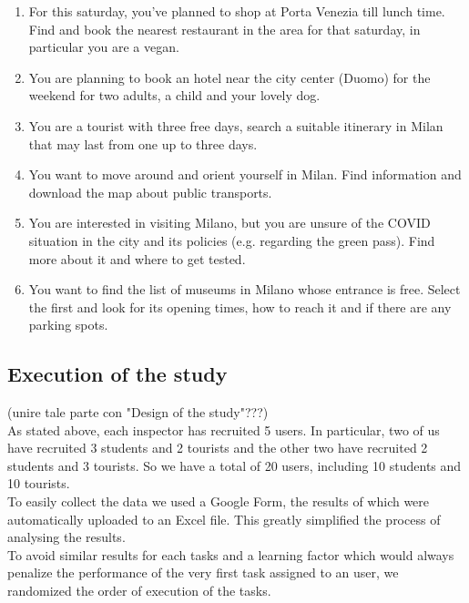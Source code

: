     \begin{enumerate}
        \item For this saturday, you've planned to shop at Porta Venezia till lunch time. Find and book the nearest restaurant in the area for that saturday, in particular you are a vegan.
        \item You are planning to book an hotel near the city center (Duomo) for the weekend for two adults, a child and your lovely dog.
        \item You are a tourist with three free days, search a suitable itinerary in Milan that may last from one up to three days.
        \item You want to move around and orient yourself in Milan. Find information and download the map about public transports.
        \item You are interested in visiting Milano, but you are unsure of the COVID situation in the city and its policies (e.g. regarding the green pass). Find more about it and where to get tested.
        \item You want to find the list of museums in Milano whose entrance is free. Select the first and look for its opening times, how to reach it and if there are any parking spots.
    \end{enumerate}
    
\subsection{Execution of the study}
    (unire tale parte con "Design of the study"???)\\
    As stated above, each inspector has recruited 5 users. In particular, two of us have recruited 3 students and 2 tourists and the other two have recruited 2 students and 3 tourists. So we have a total of 20 users, including 10 students and 10 tourists.\\
    To easily collect the data we used a Google Form, the results of which were automatically uploaded to an Excel file. This greatly simplified the process of analysing the results.\\
    To avoid similar results for each tasks and a learning factor which would always penalize the performance of the very first task assigned to an user, we randomized the order of execution of the tasks.

